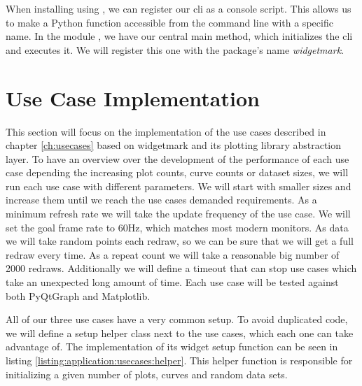 When installing  using
, we can register our \gls{cli} as a console
script. This allows us to make a Python function accessible from the command
line with a specific name. In the module , we have
our central main method, which initializes the \gls{cli} and executes it. We
will register this one with the package's name \emph{widgetmark}.







\section{Use Case Implementation}

This section will focus on the implementation of the use cases described in
chapter \ref{ch:usecases} based on widgetmark and its plotting library
abstraction layer. To have an overview over the development of the performance
of each use case depending the increasing plot counts, curve counts or dataset
sizes, we will run each use case with different parameters. We will start with
smaller sizes and increase them until we reach the use cases demanded
requirements. As a minimum refresh rate we will take the update frequency of the
use case. We will set the goal frame rate to 60Hz, which matches most modern
monitors. As data we will take random points each redraw, so we can be sure that
we will get a full redraw every time. As a repeat count we will take a
reasonable big number of 2000 redraws. Additionally we will define a timeout
that can stop use cases which take an unexpected long amount of time. Each use
case will be tested against both PyQtGraph and Matplotlib.

All of our three use cases have a very common setup. To avoid duplicated code,
we will define a setup helper class next to the use cases, which each one can
take advantage of. The implementation of its widget setup function can be seen
in listing \ref{listing:application:usecases:helper}. This helper function is
responsible for initializing a given number of plots, curves and random data
sets.

